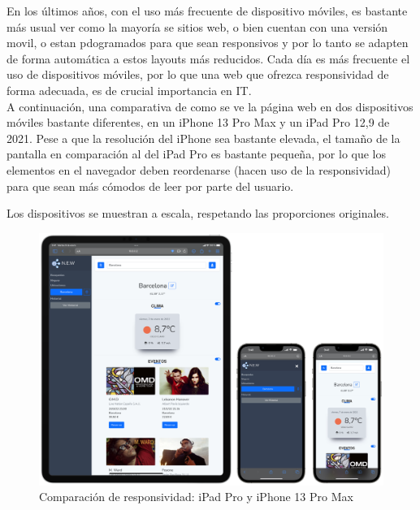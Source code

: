 \documentclass[../ei103948-project-documentation.tex]{subfiles}
\begin{document}
                                En los últimos años, con el uso más frecuente de dispositivo móviles, es bastante más usual ver como la mayoría se sitios web, o bien cuentan con una versión movil, o estan pdogramados para que sean responsivos y por lo tanto se adapten de forma automática a estos layouts más reducidos. Cada día es más frecuente el uso de dispositivos móviles, por lo que una web que ofrezca responsividad de forma adecuada, es de crucial importancia en IT.\\

                                A continuación, una comparativa de como se ve la página web en dos dispositivos móviles bastante diferentes, en un iPhone 13 Pro Max y un iPad Pro 12,9 de 2021. Pese a que la resolución del iPhone sea bastante elevada, el tamaño de la pantalla en comparación al del iPad Pro es bastante pequeña, por lo que los elementos en el navegador deben reordenarse (hacen uso de la responsividad) para que sean más cómodos de leer por parte del usuario.

                                \newpage

                                Los dispositivos se muestran a escala, respetando las proporciones originales.


                                \begin{figure}[H]
                                    \begin{center}
                                        \hspace*{-3mm} 
                                    \includegraphics[scale=0.24]{images/ipadiphonecomparacion.png}
                                    \end{center}
                                    \caption{Comparación de responsividad: iPad Pro y iPhone 13 Pro Max}
                                \end{figure}
\end{document}
